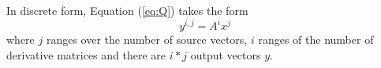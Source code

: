 \documentclass[10pt,conference,compsocconf]{IEEEtran}
\def\ttt#1{{\tt #1}}
\newcommand{\todo}[1]{{\color{red}\textbf{\hl{#1}}\xspace}}
\begin{document}
In discrete form, Equation (\ref{eq:Q}) takes the form
$$
  y^{i,j} = A^i x^j 
$$
where $j$ ranges over the number of source vectors, $i$ ranges of the number of derivative
matrices and there are $i*j$ output vectors $y$. 




%
%
%
%
%
\end{document}

